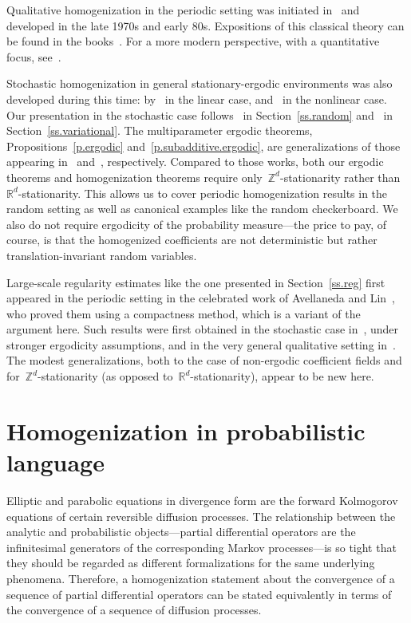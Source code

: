 \documentclass[11pt,twoside]{article} %
\numberwithin{equation}{section}
\theoremstyle{definition}
\newcommand*{\Zd}{\ensuremath{\mathbb{Z}^d}}
\newcommand*{\Rd}{\ensuremath{\mathbb{R}^d}}
\begin{document}
Qualitative homogenization in the periodic setting was initiated in~\cite{DGS} and developed in the late 1970s and early 80s. Expositions of this classical theory can be found in the books~\cite{BLP,JKO,T}. For a more modern perspective, with a quantitative focus, see~\cite{ShenBook}. 

\smallskip

Stochastic homogenization in general stationary-ergodic environments was also developed during this time: by~\cite{PV,Koz} in the linear case, and~\cite{DM1,DM2} in the nonlinear case. 
Our presentation in the stochastic case follows~\cite{PV} in Section~\ref{ss.random} and~\cite{DM1,DM2} in Section~\ref{ss.variational}. 
The multiparameter ergodic theorems, Propositions~\ref{p.ergodic} and~\ref{p.subadditive.ergodic}, are generalizations of those appearing in~\cite{Becker} and~\cite{Akc}, respectively. Compared to those works, both our ergodic theorems and homogenization theorems require only~$\Zd$-stationarity rather than~$\Rd$-stationarity. This allows us to cover periodic homogenization results in the random setting as well as canonical examples like the random checkerboard. We also do not require ergodicity of the probability measure---the price to pay, of course, is that the homogenized coefficients are not deterministic but rather translation-invariant random variables.

\smallskip

Large-scale regularity estimates like the one presented in Section~\ref{ss.reg} first appeared in the periodic setting in the celebrated work of Avellaneda and Lin~\cite{AL1,AL2}, who proved them using a compactness method, which is a variant of the argument here. Such results were first obtained in the stochastic case in~\cite{AS}, under stronger ergodicity assumptions, and in the very general qualitative setting in~\cite{GNO3}.
The modest generalizations, both to the case of non-ergodic coefficient fields and for~$\Zd$-stationarity (as opposed to~$\Rd$-stationarity), appear to be new here. 




\section{Homogenization in probabilistic language}
\label{s.probability}

Elliptic and parabolic equations in divergence form are the forward Kolmogorov equations of certain reversible diffusion processes. The relationship between the analytic and probabilistic objects---partial differential operators are the infinitesimal generators of the corresponding Markov processes---is so tight that they should be regarded as different formalizations for the same underlying phenomena. Therefore, a homogenization statement about the convergence of a sequence of partial differential operators can be stated equivalently in terms of the convergence of a sequence of diffusion processes. 
\end{document}
